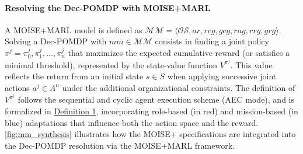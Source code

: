 \documentclass[pdflatex,sn-mathphys-num]{sn-jnl}%
\theoremstyle{thmstyleone}%
\theoremstyle{thmstyletwo}%
\theoremstyle{thmstylethree}%
\begin{document}
\paragraph{\textbf{Resolving the Dec-POMDP with MOISE+MARL}}

A MOISE+MARL model is defined as $\mathcal{MM} = \langle \mathcal{OS}, ar, rcg, gcg, rag, rrg, grg \rangle$.
Solving a Dec-POMDP with $mm \in \mathcal{MM}$ consists in finding a joint policy $\pi^j = {\pi^j_0, \pi^j_1, \dots, \pi^j_n}$ that maximizes the expected cumulative reward (or satisfies a minimal threshold), represented by the state-value function $V^{\pi^j}$. This value reflects the return from an initial state $s \in S$ when applying successive joint actions $a^j \in A^n$ under the additional organizational constraints.
%
The definition of $V^{\pi^j}$ follows the sequential and cyclic agent execution scheme (AEC mode), and is formalized in \hyperref[eq:single_value_function]{Definition 1}, incorporating role-based (in red) and mission-based (in blue) adaptations that influence both the action space and the reward.
\autoref{fig:mm_synthesis} illustrates how the MOISE+ specifications are integrated into the Dec-POMDP resolution via the MOISE+MARL framework.
\end{document}
